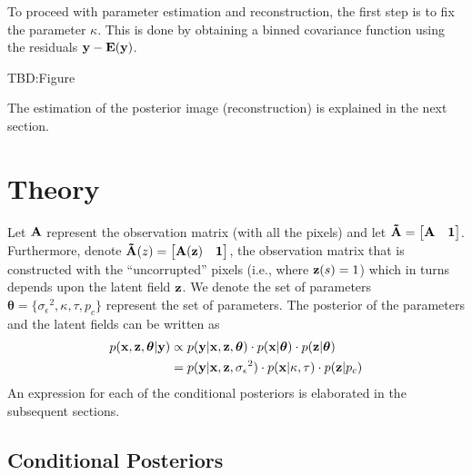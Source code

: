 \documentclass[a4paper,10pt]{article}
\def\bA{{\bf A}}
\def\bE{{\bf E}}
\def\btA{{\bf \tilde A}}
\def\bx{{\bf x}}
\def\by{{\bf y}}
\def\bz{{\bf z}}
\def\btheta{{\boldsymbol \theta}}
\def\sigmaeps{{\sigma_{\epsilon}}}
\begin{document}
To proceed with parameter estimation and reconstruction, the first step is to fix the parameter $\kappa$. This is done by obtaining a binned covariance function using the residuals $\by - \bE(\by)$. 

TBD:Figure

The estimation of the posterior image (reconstruction) is explained in the next section.

\section{Theory}
Let $\bA$ represent the observation matrix (with all the pixels) and let $\btA = \begin{bmatrix} \bA & \mathbf{1} \end{bmatrix}$. Furthermore, denote $\btA(z) = \begin{bmatrix} \bA(\bz) & \bf{1}\end{bmatrix}$, the observation matrix that is constructed with the ``uncorrupted'' pixels (i.e., where $\bz(s) = 1$) which in turns depends upon the latent field $\bz$. We denote the set of parameters  $\btheta = \{ \sigmaeps^2, \kappa, \tau, p_c\}$ represent the set of parameters. The posterior of the parameters and the latent fields can be written as
\begin{align}
 p(\bx, \bz, \btheta | \by) &\propto p(\by | \bx, \bz, \btheta) \cdot p(\bx|\btheta) \cdot p(\bz|\btheta) \nonumber \\
 &= p(\by | \bx, \bz, \sigmaeps^2) \cdot p(\bx|\kappa, \tau) \cdot p(\bz|p_c)
\end{align}
An expression for each of the conditional posteriors is elaborated in the subsequent sections.
\subsection{Conditional Posteriors}
\end{document}
